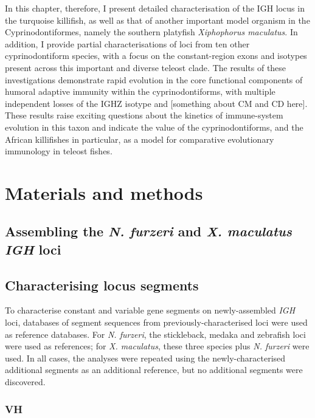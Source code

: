 In this chapter, therefore, I present detailed characterisation of the IGH locus in the turquoise killifish, as well as that of another important model organism in the Cyprinodontiformes, namely the southern platyfish \textit{Xiphophorus maculatus}. In addition, I provide partial characterisations of loci from ten other cyprinodontiform species, with a focus on the constant-region exons and isotypes present across this important and diverse teleost clade. The results of these investigations demonstrate rapid evolution in the core functional components of humoral adaptive immunity within the cyprinodontiforms, with multiple independent losses of the IGHZ isotype and [something about CM and CD here]. These results raise exciting questions about the kinetics of immune-system evolution in this taxon and indicate the value of the cyprinodontiforms, and the African killifishes in particular, as a model for comparative evolutionary immunology in teleost fishes. 

\section{Materials and methods} %

\subsection{Assembling the \textit{N. furzeri} and \textit{X. maculatus} \textit{IGH} loci}

\subsection{Characterising locus segments}

To characterise constant and variable gene segments on newly-assembled \textit{IGH} loci, databases of segment sequences from previously-characterised loci were used as reference databases. For \textit{N. furzeri}, the stickleback, medaka and zebrafish loci were used as references; for \textit{X. maculatus}, these three species plus \textit{N. furzeri} were used. In all cases, the analyses were repeated using the newly-characterised additional segments as an additional reference, but no additional segments were discovered.

\subsubsection{VH}

